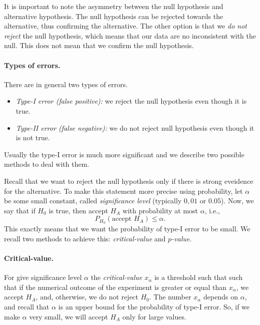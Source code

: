 
\begin{remark}
It is important to note the asymmetry between the null hypothesis and alternative hypothesis.
The null hypothesis can be rejected towards the alternative, thus confirming the alternative.
The other option is that we \emph{do not reject} the null hypothesis, which means that our data are no inconsistent with the null.
This does not mean that we confirm the null hypothesis.
\end{remark}

\paragraph{Types of errors.}
There are in general two types of errors.
\begin{itemize}
\item
\emph{Type-I error (false positive):} we reject the null hypothesis even though it is true.
\item
\emph{Type-II error (false negative):}  we do not reject null hypothesis even though it is not true.
\end{itemize}
Usually the type-I error is much more significant and we describe two possible methods to deal with them.

Recall that we want to reject the null hypothesis only if there is strong eveidence for the alternative.
To make this statement more precise using probability, let $\alpha$ be some small constant, called \emph{significance level} (typically $0,01$ or $0.05$).
Now, we say that if $H_0$ is true, then accept $H_A$ with probability at most $\alpha$, i.e.,
$$P_{H_0}(\text{accept $H_A$}) \leq \alpha.$$
This exactly means that we want the probability of type-I error to be small.
We recall two methods to achieve this: \emph{critical-value} and \emph{$p$-value}.

\paragraph{Critical-value.}
For give significance level $\alpha$ the \emph{critical-value} $x_\alpha$ is a threshold such that such that if the numerical outcome of the experiment is greater or equal than $x_\alpha$, we accept $H_A$, and, otherwise, we do not reject $H_0$.
The number $x_\alpha$ depends on $\alpha$, and recall that $\alpha$ is an upper bound for the probability of type-I error.
So, if we make $\alpha$ very small, we will accept $H_A$ only for large values.

